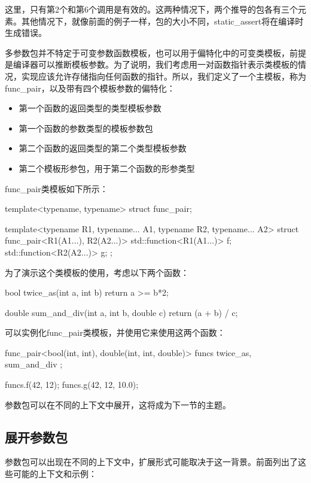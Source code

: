 这里，只有第2个和第6个调用是有效的。这两种情况下，两个推导的包各有三个元素。其他情况下，就像前面的例子一样，包的大小不同，static\_assert将在编译时生成错误。

多参数包并不特定于可变参数函数模板，也可以用于偏特化中的可变类模板，前提是编译器可以推断模板参数。为了说明，我们考虑用一对函数指针表示类模板的情况，实现应该允许存储指向任何函数的指针。所以，我们定义了一个主模板，称为func\_pair，以及带有四个模板参数的偏特化：

\begin{itemize}
  \item 第一个函数的返回类型的类型模板参数
  \item 第一个函数的参数类型的模板参数包
  \item 第二个函数的返回类型的第二个类型模板参数
  \item 第二个模板形参包，用于第二个函数的形参类型
\end{itemize}

func\_pair类模板如下所示：

\begin{cpp}
template<typename, typename>
struct func_pair;

template<typename R1, typename... A1,
         typename R2, typename... A2>
struct func_pair<R1(A1...), R2(A2...)>
{
	std::function<R1(A1...)> f;
	std::function<R2(A2...)> g;
};
\end{cpp}

为了演示这个类模板的使用，考虑以下两个函数：

\begin{cpp}
bool twice_as(int a, int b)
{
	return a >= b*2;
}

double sum_and_div(int a, int b, double c)
{
	return (a + b) / c;
}
\end{cpp}

可以实例化func\_pair类模板，并使用它来使用这两个函数：

\begin{cpp}
func_pair<bool(int, int), double(int, int, double)> funcs{
	twice_as, sum_and_div };

funcs.f(42, 12);
funcs.g(42, 12, 10.0);
\end{cpp}

参数包可以在不同的上下文中展开，这将成为下一节的主题。

\subsection{展开参数包}

参数包可以出现在不同的上下文中，扩展形式可能取决于这一背景。前面列出了这些可能的上下文和示例：


